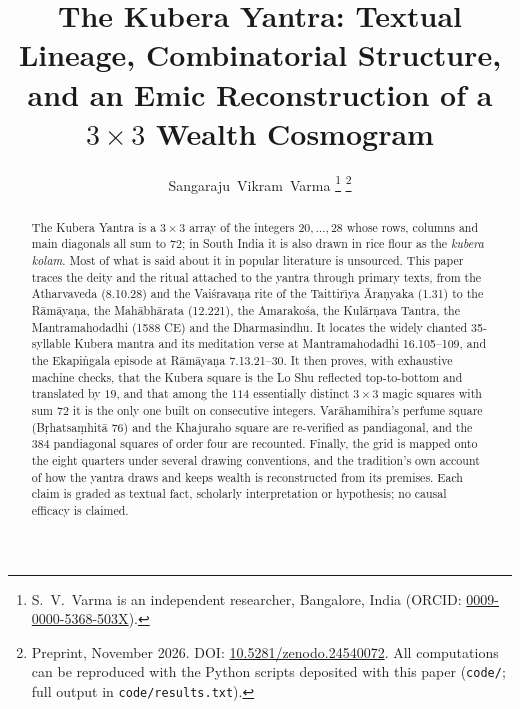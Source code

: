 \documentclass[journal]{IEEEtran}
\theoremstyle{definition}
\begin{document}
\title{The Kubera Yantra: Textual Lineage, Combinatorial Structure, and an Emic Reconstruction of a $3\times3$ Wealth Cosmogram}

\author{Sangaraju~Vikram~Varma%
\thanks{S.~V.~Varma is an independent researcher, Bangalore, India (ORCID: \href{https://orcid.org/0009-0000-5368-503X}{0009-0000-5368-503X}).}%
\thanks{Preprint, November 2026. DOI: \href{https://doi.org/10.5281/zenodo.24540072}{10.5281/zenodo.24540072}. All computations can be reproduced with the Python scripts deposited with this paper (\texttt{code/}; full output in \texttt{code/results.txt}).}}


\maketitle

\begin{abstract}
The Kubera Yantra is a $3\times3$ array of the integers $20,\dots,28$ whose rows, columns and main diagonals all sum to $72$; in South India it is also drawn in rice flour as the \emph{kubera kolam}. Most of what is said about it in popular literature is unsourced. This paper traces the deity and the ritual attached to the yantra through primary texts, from the Atharvaveda (8.10.28) and the Vai\'srava\d na rite of the Taittir\=\i ya \=Ara\d nyaka (1.31) to the R\=am\=aya\d na, the Mah\=abh\=arata (12.221), the Amarako\'sa, the Kul\=ar\d nava Tantra, the Mantramahodadhi (1588 CE) and the Dharmasindhu. It locates the widely chanted 35-syllable Kubera mantra and its meditation verse at Mantramahodadhi 16.105--109, and the Ekapi\.ngala episode at R\=am\=aya\d na 7.13.21--30. It then proves, with exhaustive machine checks, that the Kubera square is the Lo Shu reflected top-to-bottom and translated by $19$, and that among the $114$ essentially distinct $3\times3$ magic squares with sum $72$ it is the only one built on consecutive integers. Var\=ahamihira's perfume square (B\d rhatsa\d mhit\=a 76) and the Khajuraho square are re-verified as pandiagonal, and the $384$ pandiagonal squares of order four are recounted. Finally, the grid is mapped onto the eight quarters under several drawing conventions, and the tradition's own account of how the yantra draws and keeps wealth is reconstructed from its premises. Each claim is graded as textual fact, scholarly interpretation or hypothesis; no causal efficacy is claimed.
\end{abstract}
\end{document}
